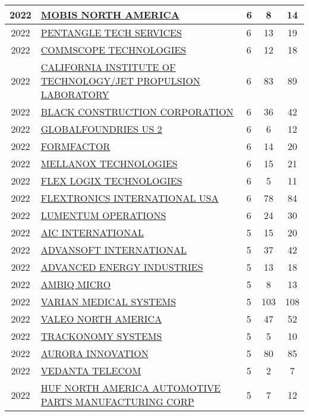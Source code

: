 \documentclass{article}%
\begin{document}
\begin{longtable}{c|p{20em}|p{5em}|c|c}
\hline%
2022&\hyperref[subsec:MOBISNORTHAMERICA]{MOBIS NORTH AMERICA}&6&8&14\\%
\hline%
2022&\hyperref[subsec:PENTANGLETECHSERVICES]{PENTANGLE TECH SERVICES}&6&13&19\\%
\hline%
2022&\hyperref[subsec:COMMSCOPETECHNOLOGIES]{COMMSCOPE TECHNOLOGIES}&6&12&18\\%
\hline%
2022&\hyperref[subsec:CALIFORNIAINSTITUTEOFTECHNOLOGY/JETPROPULSIONLABORATORY]{CALIFORNIA INSTITUTE OF TECHNOLOGY/JET PROPULSION LABORATORY}&6&83&89\\%
\hline%
2022&\hyperref[subsec:BLACKCONSTRUCTIONCORPORATION]{BLACK CONSTRUCTION CORPORATION}&6&36&42\\%
\hline%
2022&\hyperref[subsec:GLOBALFOUNDRIESUS2]{GLOBALFOUNDRIES US 2}&6&6&12\\%
\hline%
2022&\hyperref[subsec:FORMFACTOR]{FORMFACTOR}&6&14&20\\%
\hline%
2022&\hyperref[subsec:MELLANOXTECHNOLOGIES]{MELLANOX TECHNOLOGIES}&6&15&21\\%
\hline%
2022&\hyperref[subsec:FLEXLOGIXTECHNOLOGIES]{FLEX LOGIX TECHNOLOGIES}&6&5&11\\%
\hline%
2022&\hyperref[subsec:FLEXTRONICSINTERNATIONALUSA]{FLEXTRONICS INTERNATIONAL USA}&6&78&84\\%
\hline%
2022&\hyperref[subsec:LUMENTUMOPERATIONS]{LUMENTUM OPERATIONS}&6&24&30\\%
\hline%
2022&\hyperref[subsec:AICINTERNATIONAL]{AIC INTERNATIONAL}&5&15&20\\%
\hline%
2022&\hyperref[subsec:ADVANSOFTINTERNATIONAL]{ADVANSOFT INTERNATIONAL}&5&37&42\\%
\hline%
2022&\hyperref[subsec:ADVANCEDENERGYINDUSTRIES]{ADVANCED ENERGY INDUSTRIES}&5&13&18\\%
\hline%
2022&\hyperref[subsec:AMBIQMICRO]{AMBIQ MICRO}&5&8&13\\%
\hline%
2022&\hyperref[subsec:VARIANMEDICALSYSTEMS]{VARIAN MEDICAL SYSTEMS}&5&103&108\\%
\hline%
2022&\hyperref[subsec:VALEONORTHAMERICA]{VALEO NORTH AMERICA}&5&47&52\\%
\hline%
2022&\hyperref[subsec:TRACKONOMYSYSTEMS]{TRACKONOMY SYSTEMS}&5&5&10\\%
\hline%
2022&\hyperref[subsec:AURORAINNOVATION]{AURORA INNOVATION}&5&80&85\\%
\hline%
2022&\hyperref[subsec:VEDANTATELECOM]{VEDANTA TELECOM}&5&2&7\\%
\hline%
2022&\hyperref[subsec:HUFNORTHAMERICAAUTOMOTIVEPARTSMANUFACTURINGCORP]{HUF NORTH AMERICA AUTOMOTIVE PARTS MANUFACTURING CORP}&5&7&12\\%

\end{longtable}
\end{document}
